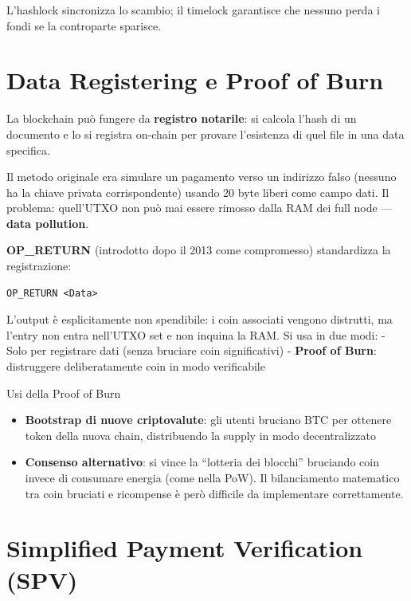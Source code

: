 \documentclass[
  italian,
  openany]{book}
\providecommand{\tightlist}{%
  \setlength{\itemsep}{0pt}\setlength{\parskip}{0pt}}
\begin{document}
L'hashlock sincronizza lo scambio; il timelock garantisce che nessuno
perda i fondi se la controparte sparisce.

\section{Data Registering e Proof of
Burn}\label{data-registering-e-proof-of-burn}

La blockchain può fungere da \textbf{registro notarile}: si calcola
l'hash di un documento e lo si registra on-chain per provare l'esistenza
di quel file in una data specifica.

Il metodo originale era simulare un pagamento verso un indirizzo falso
(nessuno ha la chiave privata corrispondente) usando 20 byte liberi come
campo dati. Il problema: quell'UTXO non può mai essere rimosso dalla RAM
dei full node --- \textbf{data pollution}.

\textbf{OP\_RETURN} (introdotto dopo il 2013 come compromesso)
standardizza la registrazione:

\begin{verbatim}
OP_RETURN <Data>
\end{verbatim}

L'output è esplicitamente non spendibile: i coin associati vengono
distrutti, ma l'entry non entra nell'UTXO set e non inquina la RAM. Si
usa in due modi: - Solo per registrare dati (senza bruciare coin
significativi) - \textbf{Proof of Burn}: distruggere deliberatamente
coin in modo verificabile

\begin{calloutnote}{Usi della Proof of Burn}

\begin{itemize}
\tightlist
\item
  \textbf{Bootstrap di nuove criptovalute}: gli utenti bruciano BTC per
  ottenere token della nuova chain, distribuendo la supply in modo
  decentralizzato
\item
  \textbf{Consenso alternativo}: si vince la ``lotteria dei blocchi''
  bruciando coin invece di consumare energia (come nella PoW). Il
  bilanciamento matematico tra coin bruciati e ricompense è però
  difficile da implementare correttamente.
\end{itemize}

\end{calloutnote}

\section{Simplified Payment Verification
(SPV)}\label{simplified-payment-verification-spv}
\end{document}
